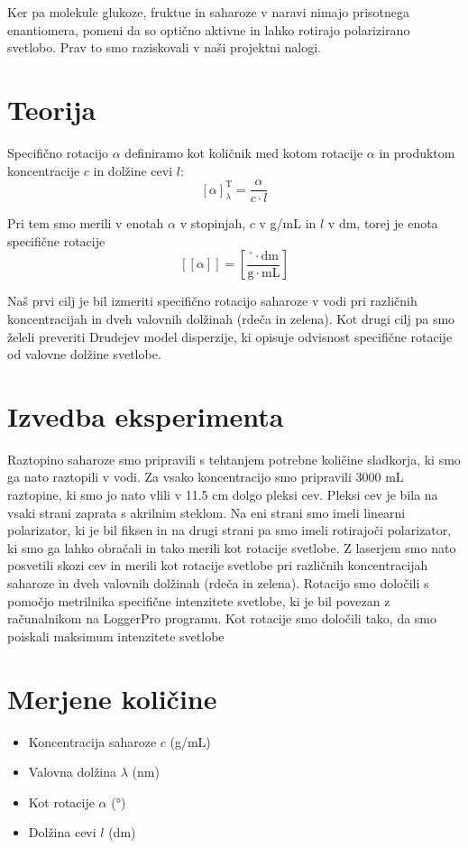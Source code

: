 \documentclass[a4paper,12pt]{article}
\begin{document}
Ker pa molekule glukoze, fruktue in saharoze v naravi nimajo prisotnega enantiomera, pomeni da so optično aktivne in lahko rotirajo polarizirano svetlobo. Prav to smo raziskovali v naši projektni nalogi.

\section*{Teorija}

Specifično rotacijo $\alpha$ definiramo kot količnik med kotom rotacije $\alpha$ in produktom koncentracije $c$ in dolžine cevi $l$:
\[
[\alpha]^{\text{T}}_{\lambda}= \frac{\alpha}{c \cdot l}
\]

Pri tem smo merili v enotah $\alpha$ v stopinjah, $c$ v g/mL in $l$ v dm, torej je enota specifične rotacije 
\[
\left[ [\alpha] \right] = \left[ \frac{^\circ \cdot \mathrm{dm}}{\mathrm{g} \cdot \mathrm{mL}} \right]
\]


Naš prvi cilj je bil izmeriti specifično rotacijo saharoze v vodi pri različnih koncentracijah in dveh valovnih dolžinah (rdeča in zelena).
Kot drugi cilj pa smo želeli preveriti Drudejev model disperzije, ki opisuje odvisnost specifične rotacije od valovne dolžine svetlobe.

\section*{Izvedba eksperimenta}

Raztopino saharoze smo pripravili s tehtanjem potrebne količine sladkorja, ki smo ga nato raztopili v vodi. Za vsako koncentracijo smo pripravili 3000 mL raztopine, ki smo jo nato vlili v 11.5 cm dolgo pleksi cev.
Pleksi cev je bila na vsaki strani zaprata s akrilnim steklom. Na eni strani smo imeli linearni polarizator, ki je bil fiksen in na drugi strani pa smo imeli rotirajoči polarizator, ki smo ga lahko obračali in tako merili kot rotacije svetlobe.
Z laserjem smo nato posvetili skozi cev in merili kot rotacije svetlobe pri različnih koncentracijah saharoze in dveh valovnih dolžinah (rdeča in zelena). Rotacijo smo določili s 
pomočjo metrilnika specifične intenzitete svetlobe, ki je bil povezan z računalnikom na LoggerPro programu. Kot rotacije smo določili tako, da smo poiskali maksimum intenzitete svetlobe 


\section*{Merjene količine}
\begin{itemize}
    \item Koncentracija saharoze $c$ (g/mL)
    \item Valovna dolžina $\lambda$ (nm)
    \item Kot rotacije $\alpha$ (°)
    \item Dolžina cevi $l$ (dm)
\end{itemize}
\end{document}
